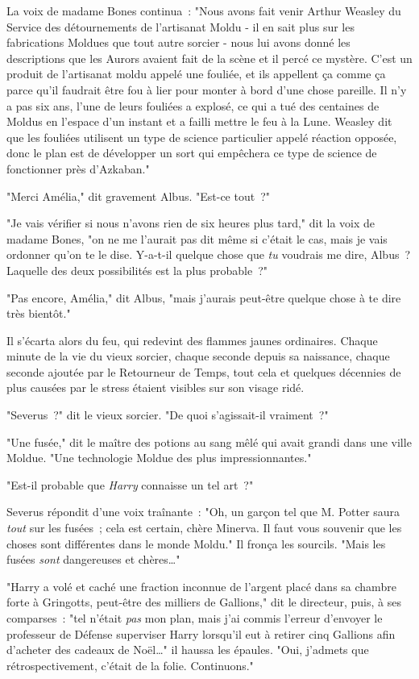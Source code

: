 La voix de madame Bones continua~: "Nous avons fait venir Arthur Weasley du Service des détournements de l'artisanat Moldu - il en sait plus sur les fabrications Moldues que tout autre sorcier - nous lui avons donné les descriptions que les Aurors avaient fait de la scène et il percé ce mystère. C'est un produit de l'artisanat moldu appelé une fouliée, et ils appellent ça comme ça parce qu'il faudrait être fou à lier pour monter à bord d'une chose pareille. Il n'y a pas six ans, l'une de leurs fouliées a explosé, ce qui a tué des centaines de Moldus en l'espace d'un instant et a failli mettre le feu à la Lune. Weasley dit que les fouliées utilisent un type de science particulier appelé réaction opposée, donc le plan est de développer un sort qui empêchera ce type de science de fonctionner près d'Azkaban."

"Merci Amélia," dit gravement Albus. "Est-ce tout~?"

"Je vais vérifier si nous n'avons rien de six heures plus tard," dit la voix de madame Bones, "on ne me l'aurait pas dit même si c'était le cas, mais je vais ordonner qu'on te le dise. Y-a-t-il quelque chose que \emph{tu} voudrais me dire, Albus~? Laquelle des deux possibilités est la plus probable~?"

"Pas encore, Amélia," dit Albus, "mais j'aurais peut-être quelque chose à te dire très bientôt."

Il s'écarta alors du feu, qui redevint des flammes jaunes ordinaires. Chaque minute de la vie du vieux sorcier, chaque seconde depuis sa naissance, chaque seconde ajoutée par le Retourneur de Temps, tout cela et quelques décennies de plus causées par le stress étaient visibles sur son visage ridé.

"Severus~?" dit le vieux sorcier. "De quoi s'agissait-il vraiment~?"

"Une fusée," dit le maître des potions au sang mêlé qui avait grandi dans une ville Moldue. "Une technologie Moldue des plus impressionnantes."

"Est-il probable que \emph{Harry} connaisse un tel art~?"

Severus répondit d'une voix traînante~: "Oh, un garçon tel que M. Potter saura \emph{tout} sur les fusées~; cela est certain, chère Minerva. Il faut vous souvenir que les choses sont différentes dans le monde Moldu." Il fronça les sourcils. "Mais les fusées \emph{sont} dangereuses et chères…"

"Harry a volé et caché une fraction inconnue de l'argent placé dans sa chambre forte à Gringotts, peut-être des milliers de Gallions," dit le directeur, puis, à ses comparses~: "tel n'était \emph{pas} mon plan, mais j'ai commis l'erreur d'envoyer le professeur de Défense superviser Harry lorsqu'il eut à retirer cinq Gallions afin d'acheter des cadeaux de Noël…" il haussa les épaules. "Oui, j'admets que rétrospectivement, c'était de la folie. Continuons."

